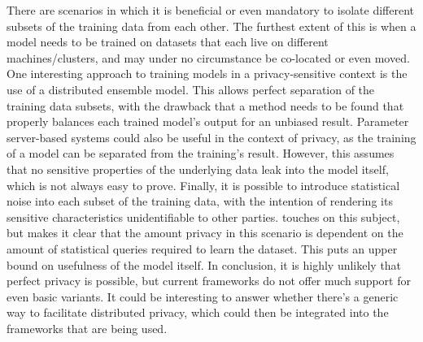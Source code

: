There are scenarios in which it is beneficial or even mandatory to isolate different subsets of the training data from each other. The furthest extent of this is when a model needs to be trained on datasets that each live on different machines/clusters, and may under no circumstance be co-located or even moved.
One interesting approach to training models in a privacy-sensitive context is the use of a distributed ensemble model. This allows perfect separation of the training data subsets, with the drawback that a method needs to be found that properly balances each trained model's output for an unbiased result.
Parameter server-based systems could also be useful in the context of privacy, as the training of a model can be separated from the training's result. However, this assumes that no sensitive properties of the underlying data leak into the model itself, which is not always easy to prove.
Finally, it is possible to introduce statistical noise into each subset of the training data, with the intention of rendering its sensitive characteristics unidentifiable to other parties. \citet{Bal12} touches on this subject, but makes it clear that the amount privacy in this scenario is dependent on the amount of statistical queries required to learn the dataset. This puts an upper bound on usefulness of the model itself.
In conclusion, it is highly unlikely that perfect privacy is possible, but current frameworks do not offer much support for even basic variants. It could be interesting to answer whether there's a generic way to facilitate distributed privacy, which could then be integrated into the frameworks that are being used.

